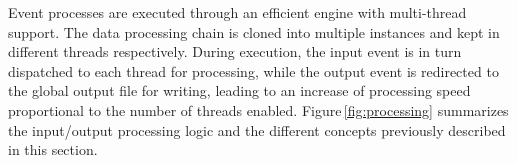 



Event processes are executed through an efficient engine with multi-thread support. The data processing chain is cloned into multiple instances and kept in different threads respectively. During execution, the input event is in turn dispatched to each thread for processing, while the output event is redirected to the global output file for writing, leading to an increase of processing speed proportional to the number of threads enabled. Figure\,\ref{fig:processing} summarizes the input/output processing logic and the different concepts previously described in this section.   %

